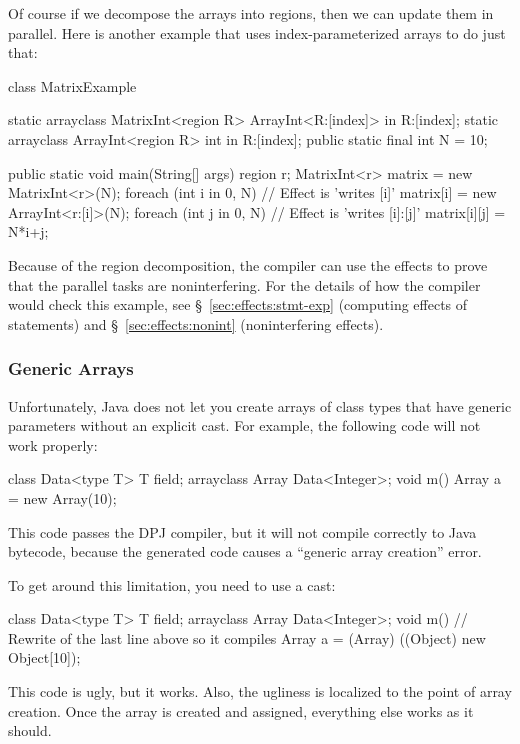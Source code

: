 Of course if we decompose the arrays into regions, then we can update
them in parallel.  Here is another example that uses
index-parameterized arrays to do just that:
%
\begin{dpjlisting}
class MatrixExample {
    static arrayclass MatrixInt<region R> {
        ArrayInt<R:[index]> in R:[index];
    }
    static arrayclass ArrayInt<region R> {
        int in R:[index];
    }
    public static final int N = 10;

    public static void main(String[] args) {
        region r;
        MatrixInt<r> matrix = new MatrixInt<r>(N);
        foreach (int i in 0, N) {
            // Effect is 'writes [i]'
            matrix[i] = new ArrayInt<r:[i]>(N);
            foreach (int j in 0, N) {
                // Effect is 'writes [i]:[j]'
                matrix[i][j] = N*i+j;
            }
        }
    }
}
\end{dpjlisting}
%
Because of the region decomposition, the compiler can use the effects
to prove that the parallel tasks are noninterfering.  For the details
of how the compiler would check this example, see
\S~\ref{sec:effects:stmt-exp} (computing effects of statements) and
\S~\ref{sec:effects:nonint} (noninterfering effects).

\subsubsection{Generic Arrays}

Unfortunately, Java does not let you create arrays of class types that
have generic parameters without an explicit cast.  For example, the
following code will not work properly:
%
\begin{dpjlisting}
class Data<type T> {
    T field;
    arrayclass Array {
        Data<Integer>;
    }
    void m() {
        Array a = new Array(10);
    }
}
\end{dpjlisting}
%
This code passes the DPJ compiler, but it will not compile correctly
to Java bytecode, because the generated code causes a ``generic array
creation'' error.

To get around this limitation, you need to use a cast:
%
\begin{dpjlisting}
class Data<type T> {
    T field;
    arrayclass Array {
        Data<Integer>;
    }
    void m() {
        // Rewrite of the last line above so it compiles
        Array a = (Array) ((Object) new Object[10]);
    }
}
\end{dpjlisting}
%
This code is ugly, but it works.  Also, the ugliness is localized to
the point of array creation.  Once the array is created and assigned,
everything else works as it should.

